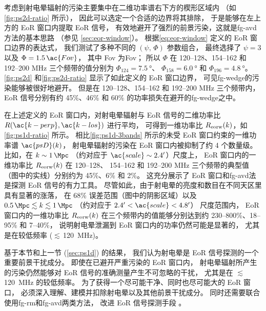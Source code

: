 考虑到射电晕辐射的污染主要集中在二维功率谱右下方的楔形区域内
（如\autoref{fig:ps2d-ratio} 所示），
因此可以选定一个合适的边界将其排除，
于是能够在左上方的 EoR 窗口内提取 EoR 信号，
有效地避开了强烈的前景污染，这就是\ac{fg-avd}方法的基本思路
（参见 \autoref{sec:eor-window}）。
根据\autoref{eq:eor-window} 定义的 EoR 窗口边界的表达式，
我们测试了多种不同的 $(\psi,\, \Phi)$ 参数组合，
最终选择了 $\psi = 3$ 以及 $\Phi = 1.5\,\ac{Fov}$，
其中 \ac{Fov} 为\acl{Fov}；
所以 $\Phi$ 在 \numrange{120}{128}、\numrange{154}{162}
和 \numrange{192}{200} \si{\MHz} 三个频带的值分别为
$\Phi_{124} = \SI{7.5}{\degree}$、
$\Phi_{158} = \SI{6.0}{\degree}$ 和
$\Phi_{196} = \SI{4.8}{\degree}$。
\autoref{fig:ps2d} 和\autoref{fig:ps2d-ratio} 显示了如此定义的 EoR 窗口边界，
可见\ac{fg-wedge}的污染能够被很好地避开。
但是在 \numrange{120}{128}、\numrange{154}{162}
和 \numrange{192}{200} \si{\MHz} 三个频带内，
EoR 信号分别有约 45\%、46\% 和 60\% 的功率损失在避开的\ac{fg-wedge}之中。

在上述定义的 EoR 窗口内，对射电晕辐射与 EoR 信号的二维功率比
$R(\ac{k-perp}, \ac{k-los})$ 进行平均，
可得到一维功率比 $R_{\mathrm{eorw}}(k)$，如\autoref{fig:ps1d-ratio} 所示。
相比\autoref{fig:ps1d-3bands} 所示的未受 EoR 窗口约束的一维功率谱 $\ac{psD}(k)$，
射电晕辐射的污染在 EoR 窗口内被抑制了约 4 个数量级。
比如，在 $k \sim \SI{1}{\per\Mpc}$
（约对应于 $\ac{scale} \sim \SI{2.4}{\arcminute}$）尺度上，
EoR 窗口内的一维功率比 $R_{\mathrm{eorw}}(k)$ 在 \numrange{120}{128}、
\numrange{154}{162} 和 \numrange{192}{200} \si{\MHz}
三个频带的典型值（图中的实线）分别约为 45\%、6\% 和 2\%。
这充分展示了 EoR 窗口和\ac{fg-avd}法是探测 EoR 信号的有力工具。
尽管如此，由于射电晕的亮度和数目在不同天区里具有显著的涨落，
在 68\% 误差范围（图中的阴影区域）以及
$\SI{0.5}{\per\Mpc} \lesssim k \lesssim \SI{1}{\per\Mpc}$
（约对应于 $\SI{2.4}{\arcminute} < \ac{scale} < \SI{4.8}{\arcminute}$）
尺度范围内，
EoR 窗口内的一维功率比 $R_{\mathrm{eorw}}(k)$ 在三个频带内的值能够分别达到约
\numrange{230}{800}\%、\numrange{18}{95}\% 和 \numrange{7}{40}\%，
说明射电晕泄漏到 EoR 窗口内的功率仍然可能是显著的，
尤其是在较低频率 ($\lesssim$\,\SI{120}{\MHz})。

基于本节和上一节 (\autoref{sec:ps1d}) 的结果，
我们认为射电晕是 EoR 信号探测的一个重要前景干扰成分。
即使在已避开严重污染的 EoR 窗口内，
射电晕辐射所产生的污染仍然能够对 EoR 信号的准确测量产生不可忽略的干扰，
尤其是在 $\lesssim$\,\SI{120}{\MHz} 的较低频率。
为了获得一个尽可能干净、同时也尽可能大的 EoR 窗口，
必须深入理解、建模并扣除射电晕以及其他前景干扰成分。
同时还需要联合使用\ac{fg-rm}和\ac{fg-avd}两类方法，
改进 EoR 信号探测手段 \cite{kerrigan2018}。


